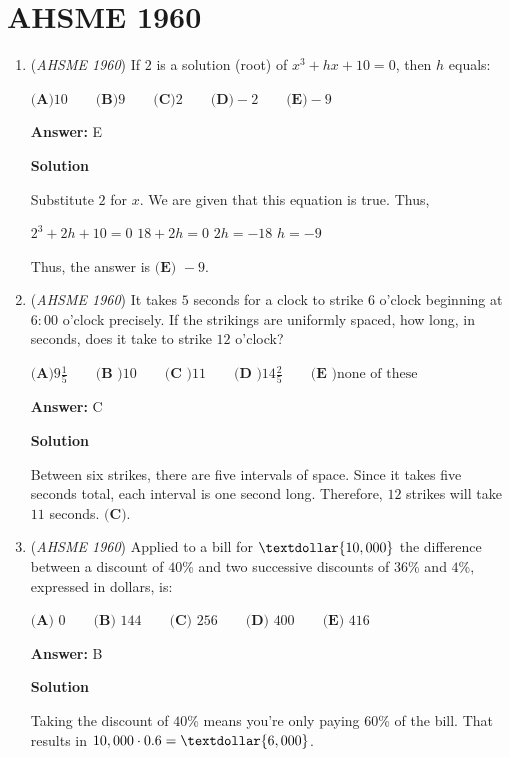 \section{AHSME 1960}
        \begin{enumerate}
        	\item (\textit{AHSME 1960}) If $2$ is a solution (root) of $x^3+hx+10=0$, then $h$ equals:


 $\textbf{(A)}10\qquad \textbf{(B)}9 \qquad \textbf{(C)}2\qquad \textbf{(D)}-2\qquad \textbf{(E)}-9$

 \textbf{Answer: }E



\textbf{Solution}

Substitute $2$ for $x$. We are given that this equation is true. Thus, 

 $2^3+2h+10 =0$
$18+2h=0$
$2h=-18$
$h=-9$

 Thus, the answer is $\boxed{\textbf{(E) }-9}$.

 


	\item (\textit{AHSME 1960}) It takes $5$ seconds for a clock to strike $6$ o'clock beginning at $6{:}00$ o'clock precisely. 
If the strikings are uniformly spaced, how long, in seconds, does it take to strike $12$ o'clock?


 $\textbf{(A)}9\frac{1}{5}\qquad \textbf{(B )}10\qquad \textbf{(C )}11\qquad \textbf{(D )}14\frac{2}{5}\qquad \textbf{(E )}\text{none of these}$

 \textbf{Answer: }C



\textbf{Solution}

Between six strikes, there are five intervals of space. Since it takes five seconds total, each interval is one second long. Therefore, $12$ strikes will take $11$ seconds. $\boxed{\textbf{(C)}}$.

 


	\item (\textit{AHSME 1960}) Applied to a bill for $\textdollar{10,000}$ the difference between a discount of $40$\% and two successive discounts of $36$\% and $4$\%, 
expressed in dollars, is:


 $\textbf{(A) }0\qquad \textbf{(B) }144\qquad \textbf{(C) }256\qquad \textbf{(D) }400\qquad \textbf{(E) }416$

 \textbf{Answer: }B



\textbf{Solution}

Taking the discount of $40$\% means you're only paying $60$\% of the bill.  That results in $10,000\cdot0.6=\textdollar{6,000}$.


\end{enumerate}
